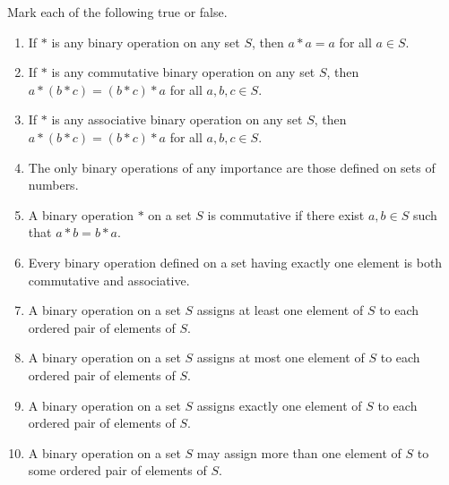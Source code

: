 \begin{exercise}
    Mark each of the following true or false.
    \begin{enumerate}[label={\textbf{\alph*.}},itemsep=0pt,topsep=0pt]
        \item If $*$ is any binary operation on any set $S$, then $a * a = a$ for all $a\in S$.
        \item If $*$ is any commutative binary operation on any set $S$, then $a * (b * c) = (b * c) * a$ for all $a, b, c \in S$.
        \item If $*$ is any associative binary operation on any set $S$, then $a * (b * c) = (b * c) * a$ for all $a, b, c \in S$.
        \item The only binary operations of any importance are those defined on sets of numbers.
        \item A binary operation $*$ on a set $S$ is commutative if there exist $a, b \in S$ such that $a * b = b * a$.
        \item Every binary operation defined on a set having exactly one element is both commutative and associative.
        \item A binary operation on a set $S$ assigns at least one element of $S$ to each ordered pair of elements of $S$.
        \item A binary operation on a set $S$ assigns at most one element of $S$ to each ordered pair of elements of $S$.
        \item A binary operation on a set $S$ assigns exactly one element of $S$ to each ordered pair of elements of $S$.
        \item A binary operation on a set $S$ may assign more than one element of $S$ to some ordered pair of elements of $S$.
    \end{enumerate}
\end{exercise}

